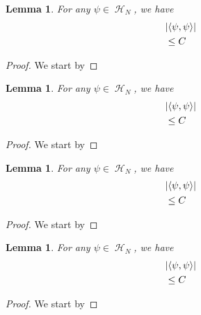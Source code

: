 \documentclass[sn-mathphys, Numbered ,a4paper]{sn-jnl}%
\DeclareMathOperator{\HH}{\mathcal{H}}
\newcommand{\eva}[1]{\left\langle #1 \right\rangle}
\theoremstyle{plain}
\newtheorem{lemma}[theorem]{Lemma}
\theoremstyle{definition}
\theoremstyle{remark}
\theoremstyle{plain}
\theoremstyle{definition}
\theoremstyle{remark}
\begin{document}
\begin{lemma}
    For any $\psi \in \HH_N$, we have
    \begin{align}
        &\abs{\eva{\psi,   \psi}}\nonumber\\&\leq C
    \end{align}
\end{lemma}
\begin{proof}
    We start by
\end{proof}

\begin{lemma}
	For any $\psi \in \HH_N$, we have
	\begin{align}
		&\abs{\eva{\psi,   \psi}}\nonumber\\&\leq C
	\end{align}
\end{lemma}
\begin{proof}
	We start by
\end{proof}

\begin{lemma}
	For any $\psi \in \HH_N$, we have
	\begin{align}
		&\abs{\eva{\psi,   \psi}}\nonumber\\&\leq C
	\end{align}
\end{lemma}
\begin{proof}
	We start by
\end{proof}

\begin{lemma}
	For any $\psi \in \HH_N$, we have
	\begin{align}
		&\abs{\eva{\psi,   \psi}}\nonumber\\&\leq C
	\end{align}
\end{lemma}
\begin{proof}
	We start by
\end{proof}
\end{document}
